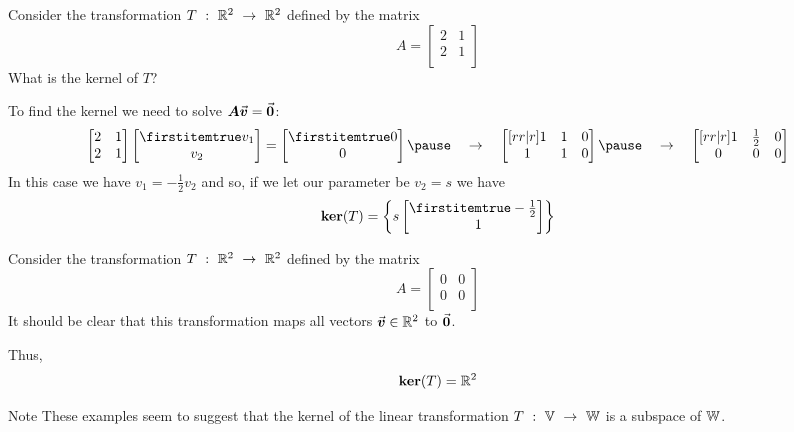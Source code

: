 \documentclass{beamer}
\begin{document}
\begin{frame}
\begin{example}
Consider the transformation $T\ :\ \mathbb{R}^2\ \rightarrow\ \mathbb{R}^2$ defined by the matrix
\begin{equation*}A=
\begin{bmatrix}
2 & 1 \\
2 & 1 \\
\end{bmatrix}
\end{equation*}
What is the kernel of $T$?\pause

\vspace{2mm}
To find the kernel we need to solve $\boldsymbol{A}{\vec{\boldsymbol{v}}}={\vec{\boldsymbol{0}}}$:
\begin{equation*}
\begin{bmatrix}
2 & 1 \\
2 & 1 \\
\end{bmatrix}
\bvector{v_1,v_2}=\bvector{0,0}
\pause\quad\rightarrow\quad
\begin{bmatrix}[rr|r]
1 & 1 & 0 \\
1 & 1 & 0 \\
\end{bmatrix}
\pause\quad\rightarrow\quad
\begin{bmatrix}[rr|r]
1 & \tfrac{1}{2} & 0 \\
0 & 0 & 0 \\
\end{bmatrix}
\end{equation*}\pause
In this case we have $v_1=-\tfrac{1}{2}v_2$ and so, if we let our parameter be $v_2=s$ we have
\begin{equation*}
\ker(T)=\left\{s\bvector{-\tfrac{1}{2},\+1}\right\}
\end{equation*}
\end{example}
\end{frame}

\begin{frame}
\begin{example}
Consider the transformation $T\ :\ \mathbb{R}^2\ \rightarrow\ \mathbb{R}^2$ defined by the matrix
\begin{equation*}A=
\begin{bmatrix}
0 & 0 \\
0 & 0 \\
\end{bmatrix}
\end{equation*}\pause
It should be clear that this transformation maps all vectors ${\vec{\boldsymbol{v}}}\in\mathbb{R}^2$ to ${\vec{\boldsymbol{0}}}$.\pause

\vspace{2mm}
Thus,
\begin{equation*}
\operatorname{\textbf{ker}}(T)=\mathbb{R}^2
\end{equation*}
\end{example}\pause
\begin{block}{Note}
These examples seem to suggest that the kernel of the linear transformation $T\ :\ \mathbb{V}\ \rightarrow\ \mathbb{W}$ is a subspace of $\mathbb{W}$.
\end{block}
\end{frame}
\end{document}
